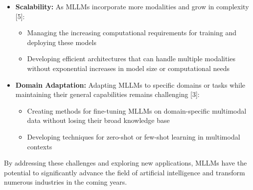 \begin{itemize}
    \item \textbf{Scalability:} As MLLMs incorporate more modalities and grow in complexity [5]:
    \begin{itemize}
        \item Managing the increasing computational requirements for training and deploying these models
        \item Developing efficient architectures that can handle multiple modalities without exponential increases in model size or computational needs
    \end{itemize}
    
    \item \textbf{Domain Adaptation:} Adapting MLLMs to specific domains or tasks while maintaining their general capabilities remains challenging [3]:
    \begin{itemize}
        \item Creating methods for fine-tuning MLLMs on domain-specific multimodal data without losing their broad knowledge base
        \item Developing techniques for zero-shot or few-shot learning in multimodal contexts
    \end{itemize}
\end{itemize}

By addressing these challenges and exploring new applications, MLLMs have the potential to significantly advance the field of artificial intelligence and transform numerous industries in the coming years.
